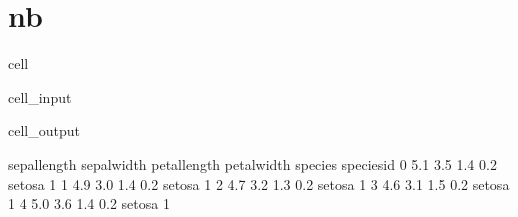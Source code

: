 \documentclass[letterpaper,10pt,english]{jupyterBook}
\begin{document}
\section{nb}
\label{\detokenize{prenb:nb}}\label{\detokenize{prenb::doc}}
\begin{sphinxuseclass}{cell}\begin{sphinxVerbatimInput}

\begin{sphinxuseclass}{cell_input}
\begin{sphinxVerbatim}[commandchars=\\\{\}]
   
  
\end{sphinxVerbatim}

\end{sphinxuseclass}\end{sphinxVerbatimInput}
\begin{sphinxVerbatimOutput}

\begin{sphinxuseclass}{cell_output}
\begin{sphinxVerbatim}[commandchars=\\\{\}]
   sepal\PYGZus{}length  sepal\PYGZus{}width  petal\PYGZus{}length  petal\PYGZus{}width species  species\PYGZus{}id
0           5.1          3.5           1.4          0.2  setosa           1
1           4.9          3.0           1.4          0.2  setosa           1
2           4.7          3.2           1.3          0.2  setosa           1
3           4.6          3.1           1.5          0.2  setosa           1
4           5.0          3.6           1.4          0.2  setosa           1
\end{sphinxVerbatim}

\end{sphinxuseclass}\end{sphinxVerbatimOutput}

\end{sphinxuseclass}
\end{document}
